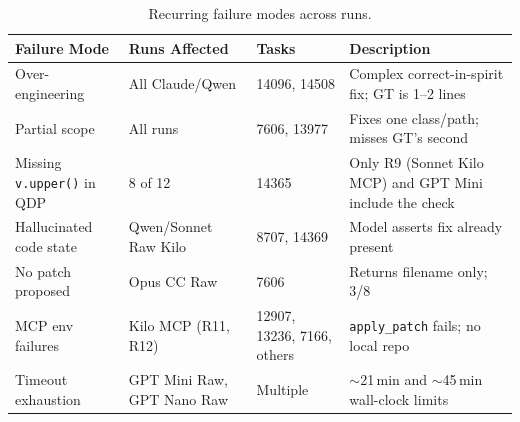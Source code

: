 \begin{table}[h]
\centering
\small
\caption{Recurring failure modes across runs.}\label{tab:failures}
\setlength{\tabcolsep}{4pt}
\begin{tabular}{p{4.5cm} p{3cm} p{3cm} p{4cm}}
\toprule
\textbf{Failure Mode} & \textbf{Runs Affected} & \textbf{Tasks} & \textbf{Description} \\
\midrule
Over-engineering & All Claude/Qwen & 14096, 14508 & Complex correct-in-spirit fix; GT is 1--2 lines \\[3pt]
Partial scope & All runs & 7606, 13977 & Fixes one class/path; misses GT's second \\[3pt]
Missing \texttt{v.upper()} in QDP & 8 of 12 & 14365 & Only R9 (Sonnet Kilo MCP) and GPT Mini include the check \\[3pt]
Hallucinated code state & Qwen/Sonnet Raw Kilo & 8707, 14369 & Model asserts fix already present \\[3pt]
No patch proposed & Opus CC Raw & 7606 & Returns filename only; 3/8 \\[3pt]
MCP env failures & Kilo MCP (R11, R12) & 12907, 13236, 7166, others & \texttt{apply\_patch} fails; no local repo \\[3pt]
Timeout exhaustion & GPT Mini Raw, GPT Nano Raw & Multiple & $\sim$21\,min and $\sim$45\,min wall-clock limits \\
\bottomrule
\end{tabular}
\end{table}
